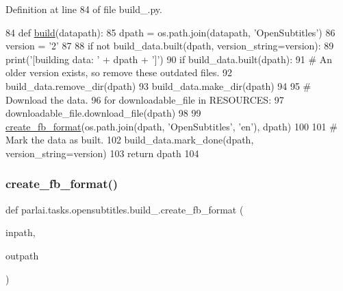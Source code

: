 Definition at line 84 of file build\+\_.\+py.


\begin{DoxyCode}
84 \textcolor{keyword}{def }\hyperlink{namespaceparlai_1_1tasks_1_1opensubtitles_1_1build__2009_a1b4aedcfe5cf20f4708277aba234e048}{build}(datapath):
85     dpath = os.path.join(datapath, \textcolor{stringliteral}{'OpenSubtitles'})
86     version = \textcolor{stringliteral}{'2'}
87 
88     \textcolor{keywordflow}{if} \textcolor{keywordflow}{not} build\_data.built(dpath, version\_string=version):
89         print(\textcolor{stringliteral}{'[building data: '} + dpath + \textcolor{stringliteral}{']'})
90         \textcolor{keywordflow}{if} build\_data.built(dpath):
91             \textcolor{comment}{# An older version exists, so remove these outdated files.}
92             build\_data.remove\_dir(dpath)
93         build\_data.make\_dir(dpath)
94 
95         \textcolor{comment}{# Download the data.}
96         \textcolor{keywordflow}{for} downloadable\_file \textcolor{keywordflow}{in} RESOURCES:
97             downloadable\_file.download\_file(dpath)
98 
99         \hyperlink{namespaceparlai_1_1tasks_1_1opensubtitles_1_1build__2009_ad149abe80311061e9b055102702633ed}{create\_fb\_format}(os.path.join(dpath, \textcolor{stringliteral}{'OpenSubtitles'}, \textcolor{stringliteral}{'en'}), dpath)
100 
101         \textcolor{comment}{# Mark the data as built.}
102         build\_data.mark\_done(dpath, version\_string=version)
103     \textcolor{keywordflow}{return} dpath
104 \end{DoxyCode}
\mbox{\label{namespaceparlai_1_1tasks_1_1opensubtitles_1_1build__2009_ad149abe80311061e9b055102702633ed}} 
\subsubsection{\texorpdfstring{create\+\_\+fb\+\_\+format()}{create\_fb\_format()}}
{\footnotesize\ttfamily def parlai.\+tasks.\+opensubtitles.\+build\+\_.\+create\+\_\+fb\+\_\+format (\begin{DoxyParamCaption}\item[{}]{inpath,  }\item[{}]{outpath }\end{DoxyParamCaption})}



